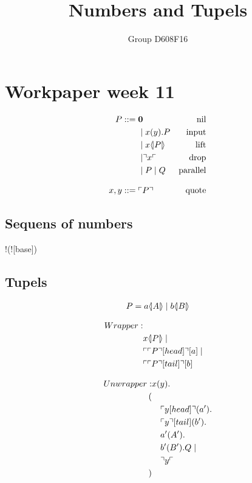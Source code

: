 

\author{Group D608F16}
\title{Numbers and Tupels}



\maketitle

\section{Workpaper week 11}

\begin{align*}
P  ::= \; &  \mathbf{0} & \text{nil} \\
  & \mid x(y).P & \text{input} \\
  & \mid x \langle \! | P | \! \rangle & \text{lift} \\
  & \mid \urcorner x \ulcorner & \text{drop} \\
  & \mid P \mid Q & \text{parallel} \\[3mm]
x,y ::= \; & \ulcorner P \urcorner & \text{quote}
\end{align*}
\citep{Meredith2005}



\subsection{Sequens of numbers}
!(![base]\para {})

\subsection{Tupels}
\begin{align*}
P=a \langle \! | A | \! \rangle\mid b \langle \! | B | \! \rangle
\end{align*}



\begin{align*}
Wrapper:
\\ & x \langle \! | P | \! \rangle\mid
\\ & \ulcorner \ulcorner P \urcorner[head] \urcorner[a]\mid
\\ & \ulcorner \ulcorner P \urcorner[tail] \urcorner[b]
\end{align*}

\begin{align*}
Unwrapper: &x(y).\\
(\\
&\quad \ulcorner y[head] \urcorner(a').\\
&\quad \ulcorner y \urcorner[tail](b').\\
&\quad a'(A').\\
&\quad b'(B').Q\mid\\
&\quad \urcorner y \ulcorner\\
)
\end{align*}





\grid
\grid
